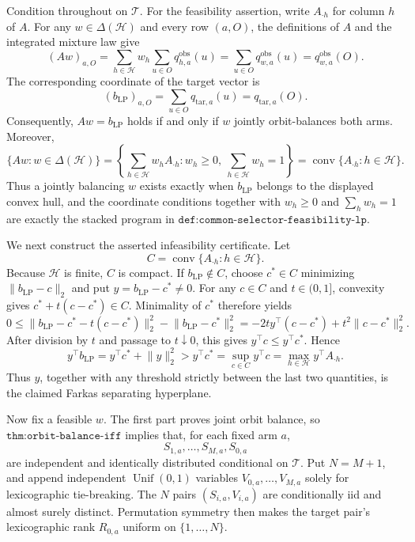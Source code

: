 Condition throughout on \(\mathcal T\). For the feasibility assertion, write \(A_{\cdot h}\) for column \(h\) of \(A\). For any \(w\in\Delta(\mathcal H)\) and every row \((a,O)\), the definitions of \(A\) and the integrated mixture law give
\[
(Aw)_{a,O}=\sum_{h\in\mathcal H}w_h\sum_{u\in O}q^{\mathrm{obs}}_{h,a}(u)=\sum_{u\in O}q^{\mathrm{obs}}_{w,a}(u)=q^{\mathrm{obs}}_{w,a}(O).
\]
The corresponding coordinate of the target vector is
\[
(b_{\mathrm{LP}})_{a,O}=\sum_{u\in O}q_{\mathrm{tar},a}(u)=q_{\mathrm{tar},a}(O).
\]
Consequently, \(Aw=b_{\mathrm{LP}}\) holds if and only if \(w\) jointly orbit-balances both arms. Moreover,
\[
\{Aw:w\in\Delta(\mathcal H)\}=\left\{\sum_{h\in\mathcal H}w_hA_{\cdot h}:w_h\ge0,\ \sum_{h\in\mathcal H}w_h=1\right\}=\operatorname{conv}\{A_{\cdot h}:h\in\mathcal H\}.
\]
Thus a jointly balancing \(w\) exists exactly when \(b_{\mathrm{LP}}\) belongs to the displayed convex hull, and the coordinate conditions together with \(w_h\ge0\) and \(\sum_h w_h=1\) are exactly the stacked program in \(\texttt{def:common-selector-feasibility-lp}\).

We next construct the asserted infeasibility certificate. Let
\[
C=\operatorname{conv}\{A_{\cdot h}:h\in\mathcal H\}.
\]
Because \(\mathcal H\) is finite, \(C\) is compact. If \(b_{\mathrm{LP}}\notin C\), choose \(c^*\in C\) minimizing \(\lVert b_{\mathrm{LP}}-c\rVert_2\) and put \(y=b_{\mathrm{LP}}-c^*\neq0\). For any \(c\in C\) and \(t\in(0,1]\), convexity gives \(c^*+t(c-c^*)\in C\). Minimality of \(c^*\) therefore yields
\[
0\le\lVert b_{\mathrm{LP}}-c^*-t(c-c^*)\rVert_2^2-\lVert b_{\mathrm{LP}}-c^*\rVert_2^2=-2t y^\top(c-c^*)+t^2\lVert c-c^*\rVert_2^2.
\]
After division by \(t\) and passage to \(t\downarrow0\), this gives \(y^\top c\le y^\top c^*\). Hence
\[
y^\top b_{\mathrm{LP}}=y^\top c^*+\lVert y\rVert_2^2>y^\top c^*=\sup_{c\in C}y^\top c=\max_{h\in\mathcal H}y^\top A_{\cdot h}.
\]
Thus \(y\), together with any threshold strictly between the last two quantities, is the claimed Farkas separating hyperplane.

Now fix a feasible \(w\). The first part proves joint orbit balance, so \(\texttt{thm:orbit-balance-iff}\) implies that, for each fixed arm \(a\),
\[
S_{1,a},\ldots,S_{M,a},S_{0,a}
\]
are independent and identically distributed conditional on \(\mathcal T\). Put \(N=M+1\), and append independent \(\operatorname{Unif}(0,1)\) variables \(V_{0,a},\ldots,V_{M,a}\) solely for lexicographic tie-breaking. The \(N\) pairs \((S_{i,a},V_{i,a})\) are conditionally iid and almost surely distinct. Permutation symmetry then makes the target pair's lexicographic rank \(R_{0,a}\) uniform on \(\{1,\ldots,N\}\).

